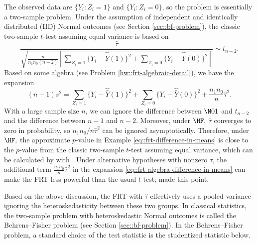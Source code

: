 The observed data are $\{  Y_i: Z_i = 1 \}$ and $\{ Y_i : Z_i = 0 \}$, so the problem is essentially a two-sample problem. 
Under the assumption of independent and identically distributed (IID) Normal outcomes (see Section \ref{sec::bf-problem}), the classic two-sample $t$-test assuming equal variance is based on
\begin{equation}\label{eq::two-sample-t-equalv}
\frac{  \hat{\tau}      }{  \sqrt{\frac{n}{n_1 n_0(n-2)}  \left[  \sum_{Z_i=1}  \{Y_i - \hat{\bar{Y}}(1)\}^2
+ \sum_{Z_i=0}  \{Y_i - \hat{\bar{Y}}(0)\}^2
    \right]  }    }   \sim t_{n-2}.
\end{equation}
Based on some algebra (see Problem \ref{hw::frt-algebraic-detail}), we have the expansion 
\begin{equation}\label{eq::frt-algebra-difference-in-means}
(n-1)s^2 = \sum_{Z_i=1}  \{Y_i - \hat{\bar{Y}}(1)\}^2 + \sum_{Z_i=0}  \{Y_i - \hat{\bar{Y}}(0)\}^2
+ \frac{n_1 n_0}{n} \hat{\tau}^2 .
\end{equation}
With a large sample size $n$, we can ignore the difference between $\N01$ and $t_{n-2}$ and the difference between $n-1$ and $n-2$.
Moreover, under $\HF,$ $\hat{\tau}$ converges to zero in probability, so $ n_1 n_0 / n \hat{\tau}^2$ can be ignored asymptotically. Therefore, under $\HF,$ the approximate $p$-value in Example \ref{eq::frt-difference-in-means} is close to the $p$-value from the classic two-sample $t$-test assuming equal variance, which can be calculated by  with . Under alternative hypotheses with nonzero $\tau$, the additional term $\frac{n_1 n_0}{n} \hat{\tau}^2$ in the expansion \eqref{eq::frt-algebra-difference-in-means} can make the FRT less powerful than the usual $t$-test; \citet{Ding:2014} made this point. 


Based on the above discussion, the FRT with $\hat{\tau}$ effectively uses a pooled variance ignoring the heteroskedasticity between these two groups. In classical statistics, the two-sample problem with heteroskedastic Normal outcomes is called the Behrens--Fisher problem (see Section \ref{sec::bf-problem}). In the Behrens--Fisher problem, a standard choice of the test statistic is the studentized statistic below. 



